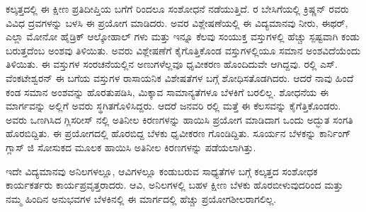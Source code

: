 ಕಲ್ಕತ್ತದಲ್ಲಿ ಈ ಕ್ಷೀಣ ಪ್ರತಿದೀಪ್ತಿಯ ಬಗೆಗೆ  ರಿಂದಲೂ ಸಂಶೋಧನೆ ನಡೆಯುತ್ತಿದೆ. ರ ಬೇಸಿಗೆಯಲ್ಲಿ ಕ್ರಿಷ್ಣನ್ ರವರು  ವಿವಿಧ ದ್ರವಗಳನ್ನು ಬಳಸಿ ಈ ಪ್ರಯೋಗ ಮಾಡಿದರು. ಅವರ ವಿಶ್ಲೇಷಣೆಯಲ್ಲಿ ಈ ವಿದ್ಯಮಾನವು ನೀರು, ಈಥರ್, ಎಲ್ಲಾ ಮೋನೋ ಹೈಡ್ರಿಕ್ ಆಲ್ಕೋಹಾಲ್ ಗಳು ಮತ್ತು ಇನ್ನೂ ಕೆಲವು ಸಂಯುಕ್ತ ವಸ್ತುಗಳಲ್ಲಿ ಹೆಚ್ಚು ಸ್ಪಷ್ಟವಾಗಿ ಕಂಡು ಬರುತ್ತದೆಂಬ ಅಂಶವು ತಿಳಿಯಿತು. ಅವರು ವಿಶ್ಲೇಷಣೆಗೆ ಕೈಗೊತ್ತಿಕೊಂಡ ವಸ್ತುಗಳಲ್ಲಿಯೂ ಸಮಾನ ಅಂಶವಿದೆಯೆಂದು ತಿಳಿಯಿತು. ಈ ವಸ್ತುಗಳ ಸಂರಚನೆಯಲ್ಲಿನ ಅಣುಗಳೆಲ್ಲವೂ ಧೃವೀಕರಣ ಹೊಂದಿದುವೇ ಆಗಿದ್ದವು. ರಲ್ಲಿ ಎಸ್. ವೆಂಕಟೇಶ್ವರನ್ ಈ ಬಗೆಯ ವಸ್ತುಗಳ ರಾಸಾಯನಿಕ ವಿಶೇಷತೆಗಳ ಬಗ್ಗೆ ಶೋಧಿಸತೊಡಗಿದರು. ಆದರೆ ನಾವು ಹಿಂದೆ ಕಂಡ ಸಮಾನ ಅಂಶವನ್ನು ಹೊರತುಪಡಿಸಿ, ಮಿಕ್ಕಾವ ಸಾಮಾನ್ಯತೆಗಳೂ ಬೆಳಕಿಗೆ ಬರಲಿಲ್ಲ. ಶೋಧನೆಯ ಈ ಮಾರ್ಗವನ್ನು ಅಲ್ಲಿಗೆ ಅವರು ಸ್ಥಗಿತಗೊಳಿಸಿದ್ದರು. ಆದರೆ ಜನವರಿ ರಲ್ಲಿ ಮತ್ತೆ ಈ ಕೆಲಸವನ್ನು ಕೈಗೆತ್ತಿಕೊಂಡರು. ಅವರು ಒಣಗಿಸಿದ ಗ್ಲಿಸರೀಸ್ ನಲ್ಲಿ ಅತಿನೀಲ ಕಿರಣಗಳನ್ನು ಹಾಯಿಸಿ ಪ್ರಯೋಗ ಮಾಡಿದಾಗ ಒಂದು ಅದ್ಭುತ ಸಂಗತಿ ಹೊರಬಿದ್ದಿತು. ಈ ಪ್ರಯೋಗದಲ್ಲಿ ಹೊರಬಿದ್ದ ಬೆಳಕು ಧೃವೀಕರಣ ಗೊಂಡಿದ್ದಿತು. ಸೂರ್ಯನ ಬೆಳಕನ್ನು ಕಾರ್ನಿಂಗ್ ಗ್ಲಾಸ್ ಜಿ\enginline{-} ಸೋಸುಕದ ಮೂಲಕ ಹಾಯಿಸಿ ಅತಿನೀಲ ಕಿರಣಗಳನ್ನು ಪಡೆಯಲಾಗಿತ್ತು.

ಇದೇ ವಿದ್ಯಮಾನವು ಅನಿಲಗಳಲ್ಲೂ, ಆವಿಗಳಲ್ಲೂ ಕಂಡುಬರುವ ಸಾಧ್ಯತೆಗಳ ಬಗ್ಗೆ ಕಲ್ಕತ್ತದ ಸಂಶೋಧಕ ಕಾರ್ಯಕರ್ತರು ಕಾರ್ಯಪ್ರವೃತ್ತರಾದರು. ಆವಿ, ಅನಿಲಗಳಲ್ಲಿ ಬಹಳ ಕ್ಷೀಣ ಬೆಳಕು ಹೊರಬೀಳುವುದರಿಂದ ಮತ್ತು ನಮ್ಮ ಹಿಂದಿನ ಅನುಭವಗಳ ಬೆಳಕಿನಲ್ಲಿ ಈ ಮಾರ್ಗದಲ್ಲಿ ಹೆಚ್ಚು ಪ್ರಯೋಗಶೀಲರಾಗಲಿಲ್ಲ.



